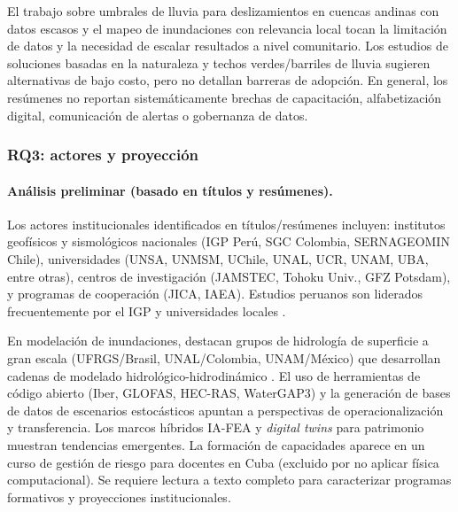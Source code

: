 \documentclass[12pt,a4paper]{article}
\begin{document}
El trabajo sobre umbrales de lluvia para deslizamientos en cuencas andinas con datos escasos \parencite{marin2021assessing} y el mapeo de inundaciones con relevancia local \parencite{kuchinski2025regional} tocan la limitación de datos y la necesidad de escalar resultados a nivel comunitario. Los estudios de soluciones basadas en la naturaleza \parencite{rivillasospina2025numerical} y techos verdes/barriles de lluvia \parencite{figueroaavalos2024evaluaci} sugieren alternativas de bajo costo, pero no detallan barreras de adopción. En general, los resúmenes no reportan sistemáticamente brechas de capacitación, alfabetización digital, comunicación de alertas o gobernanza de datos.

\subsubsection{RQ3: actores y proyección}
\label{sec:rq3}
\paragraph*{Análisis preliminar (basado en títulos y resúmenes).}
Los actores institucionales identificados en títulos/resúmenes incluyen: institutos geofísicos y sismológicos nacionales (IGP Perú, SGC Colombia, SERNAGEOMIN Chile), universidades (UNSA, UNMSM, UChile, UNAL, UCR, UNAM, UBA, entre otras), centros de investigación (JAMSTEC, Tohoku Univ., GFZ Potsdam), y programas de cooperación (JICA, IAEA). Estudios peruanos son liderados frecuentemente por el IGP y universidades locales \parencite{jimnez2023numerical, jimnez2021seismic, jimnez2023seismic, jimenez2024numerical, jimenez2025numerical, jimnez2021seismic2, flores2026numerical, cuadrosrojas2024photogrammetry, aroquipa2025methodological, loa2022experimental, loa2026seismic, fernandezmorocho2026root}. 

En modelación de inundaciones, destacan grupos de hidrología de superficie a gran escala (UFRGS/Brasil, UNAL/Colombia, UNAM/México) que desarrollan cadenas de modelado hidrológico-hidrodinámico \parencite{fagundes2021sediment, fleischmann2021regional, escobarsilva2023assessing}. El uso de herramientas de código abierto (Iber, GLOFAS, HEC-RAS, WaterGAP3) y la generación de bases de datos de escenarios estocásticos \parencite{aranguiz2024new} apuntan a perspectivas de operacionalización y transferencia. Los marcos híbridos IA-FEA \parencite{yupanqui2025hybrid} y \textit{digital twins} para patrimonio \parencite{aroquipa2025methodological} muestran tendencias emergentes. La formación de capacidades aparece en un curso de gestión de riesgo para docentes en Cuba \parencite{varelaledesma2021tecnolog} (excluido por no aplicar física computacional). Se requiere lectura a texto completo para caracterizar programas formativos y proyecciones institucionales.
\end{document}
